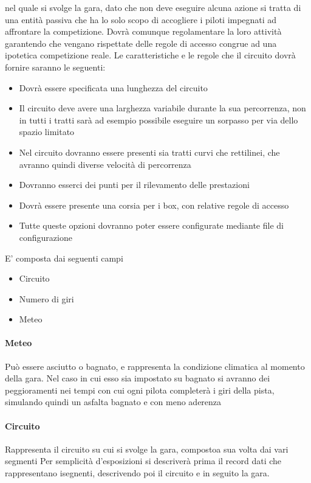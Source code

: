 \documentclass[a4paper,11pt, twoside]{book}
\begin{document}
      nel quale si svolge la gara, dato che non deve 
	eseguire alcuna azione si
	tratta di una entità passiva che ha lo solo scopo di accogliere i piloti impegnati ad affrontare la
	competizione.
	Dovrà comunque regolamentare la loro attività garantendo che vengano rispettate delle regole di accesso congrue
	ad una ipotetica competizione reale. 
	Le caratteristiche e le regole che il circuito dovrà fornire saranno le seguenti:
	
	\begin{itemize}
	  \item Dovrà essere specificata una lunghezza del circuito
	  \item Il circuito deve avere una larghezza variabile durante la sua percorrenza, non in tutti i tratti sarà
		ad esempio possibile eseguire un sorpasso per via dello spazio limitato
	  \item Nel circuito dovranno essere presenti sia tratti curvi che rettilinei, che avranno quindi diverse velocità
		di percorrenza
	  \item Dovranno esserci dei punti per il rilevamento delle prestazioni
	  \item Dovrà essere presente una corsia per i box, con relative regole di accesso
	  \item Tutte queste opzioni dovranno poter essere configurate mediante file di configurazione
	\end{itemize}
	
	E' composta dai seguenti campi
	
      \begin{itemize}
	\item Circuito
	\item Numero di giri
	\item Meteo
      \end{itemize}
	
      \paragraph{Meteo}
        Può essere asciutto o bagnato, e rappresenta la condizione climatica al momento della gara.
        Nel caso in cui esso sia impostato su bagnato si avranno dei peggioramenti nei tempi con cui ogni pilota
	completerà i giri della pista, simulando quindi un asfalta bagnato e con meno aderenza
	
      \paragraph{Circuito}
        Rappresenta il circuito su cui si svolge la gara, compostoa sua volta dai vari segmenti
	Per semplicità d'esposizioni si descriverà prima il record dati che rappresentano isegnenti, descrivendo poi il
        circuito e in seguito la gara.
      
\end{document}
